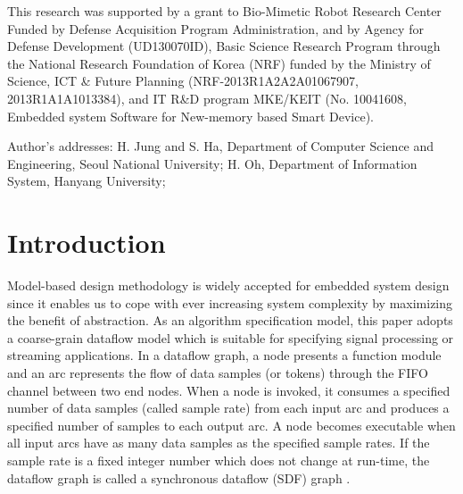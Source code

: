 \documentclass[prodmode,acmtecs]{acmsmall}
\begin{document}





\begin{bottomstuff}
This research was supported by a grant to Bio-Mimetic Robot Research Center Funded by Defense Acquisition Program Administration, and by Agency for Defense Development (UD130070ID), Basic Science Research Program through the National Research Foundation of Korea (NRF) funded by the Ministry of Science, ICT \& Future Planning (NRF-2013R1A2A2A01067907, 2013R1A1A1013384), and IT R\&D program MKE/KEIT (No. 10041608, Embedded system Software for New-memory based Smart Device).

Author's addresses: H. Jung {and} S. Ha, Department of Computer Science and Engineering,
Seoul National University; H. Oh, Department of Information System, Hanyang University; 
\end{bottomstuff}

\maketitle


\section{Introduction}
\label{Section:Introduction}

Model-based design methodology is widely accepted for embedded system design since it enables us to cope with ever increasing system complexity by maximizing the benefit of abstraction. As an algorithm specification model, this paper adopts a coarse-grain dataflow model which is suitable for specifying signal processing or streaming applications. In a dataflow graph, a node presents a function module and an arc represents the flow of data samples (or tokens) through the FIFO channel between two end nodes. When a node is invoked, it consumes a specified number of data samples (called sample rate) from each input arc and produces a specified number of samples to each output arc. A node becomes executable when all input arcs have as many data samples as the specified sample rates. If the sample rate is a fixed integer number which does not change at run-time, the dataflow graph is called a synchronous dataflow (SDF) graph \cite{Lee:1987}.
\end{document}
